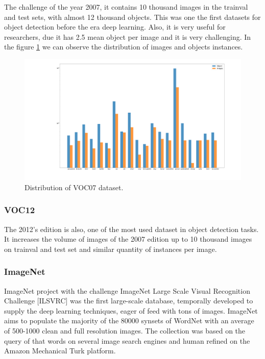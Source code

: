 \documentclass[12pt, a4paper, titlepage,twoside,openright]{article}
\begin{document}

The challenge of the year 2007, it contains 10 thousand images in the trainval and test sets, with almost 12 thousand objects. This was one the first datasets for object detection before the era deep learning. Also, it is very useful for researchers, due it has 2.5 mean object per image and it is very challenging. In the figure \ref{data07} we can observe the distribution of images and objects instances. 

\begin{figure}[hptb]
\centering         
\includegraphics[width=0.7\linewidth]{datasets/log1.png}
\caption{Distribution of VOC07 dataset.} \label{data07}
\end{figure}



\subsubsection{VOC12}

The 2012's edition is also, one of the most used dataset in object detection tasks. It increases the volume of images of the 2007 edition up to 10 thousand images on trainval and test set and similar quantity of instances per image. 


\subsubsection{ImageNet}



ImageNet project \cite{imagenet} with the challenge ImageNet Large Scale Visual Recognition Challenge [ILSVRC] was the first large-scale database, temporally developed to supply the deep learning techniques, eager of feed with tons of images. ImageNet aims to populate the majority of the 80000 synsets of WordNet with an average of 500-1000 clean and full resolution images. The collection was based on the query of that words on several image search engines and human refined on the Amazon Mechanical Turk platform.
\end{document}
